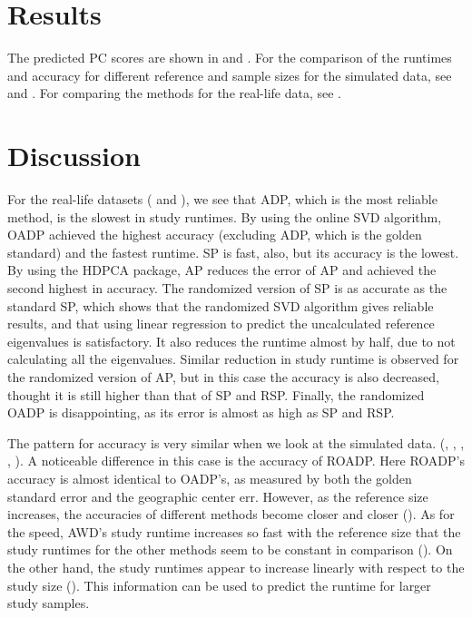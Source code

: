 \documentclass{article}
\begin{document}
\section{Results}

The predicted PC scores are shown in  and .
For the comparison of the runtimes and accuracy for different reference and sample sizes for the simulated data,
see  and .
For comparing the methods for the real-life data, see .



\section{Discussion}

For the real-life datasets ( and ),
we see that ADP, which is the most reliable method,
is the slowest in study runtimes.
By using the online SVD algorithm,
OADP achieved the highest accuracy (excluding ADP, which is the golden standard) and the fastest runtime.
SP is fast, also,
but its accuracy is the lowest.
By using the HDPCA package,
AP reduces the error of AP
and achieved the second highest in accuracy.
The randomized version of SP is as accurate as the standard SP,
which shows that the randomized SVD algorithm gives reliable results,
and that using linear regression to predict the uncalculated reference eigenvalues is satisfactory.
It also reduces the runtime almost by half,
due to not calculating all the eigenvalues.
Similar reduction in study runtime is observed for the randomized version of AP,
but in this case the accuracy is also decreased,
thought it is still higher than that of SP and RSP.
Finally, the randomized OADP is disappointing,
as its error is almost as high as SP and RSP.

The pattern for accuracy is very similar when we look at the simulated data.
(, ,
, ,
).
A noticeable difference in this case is the accuracy of ROADP.
Here ROADP's accuracy is almost identical to OADP's,
as measured by both the golden standard error and the geographic center err.
However, as the reference size increases,
the accuracies of different methods become closer and closer ().
As for the speed,
AWD's study runtime increases so fast with the reference size
that the study runtimes for the other methods seem to be constant in comparison ().
On the other hand,
the study runtimes appear to increase linearly with respect to the study size ().
This information can be used to predict the runtime for larger study samples.
\end{document}
